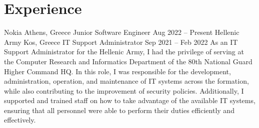 \section{Experience}

\begin{itemize}
    \cventry
        {Nokia}
        {Athens, Greece}
        {Junior Software Engineer}
        {Aug 2022 -- Present}
    \cventry
        {Hellenic Army}
        {Kos, Greece}
        {IT Support Administrator}
        {Sep 2021 -- Feb 2022}
    \cvitem
        {As an IT Support Administrator for the Hellenic Army, I had the privilege of serving at the Computer Research and Informatics Department of the 80th National Guard Higher Command HQ. In this role, I was responsible for the development, administration, operation, and maintenance of IT systems across the formation, while also contributing to the improvement of security policies. Additionally, I supported and trained staff on how to take advantage of the available IT systems, ensuring that all personnel were able to perform their duties efficiently and effectively.}
\end{itemize}
